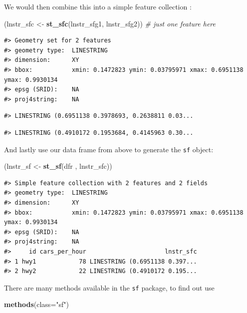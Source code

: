 \documentclass[]{book}
\newenvironment{Shaded}{\begin{snugshade}}{\end{snugshade}}
\newcommand{\KeywordTok}[1]{\textcolor[rgb]{0.13,0.29,0.53}{\textbf{#1}}}
\newcommand{\DataTypeTok}[1]{\textcolor[rgb]{0.13,0.29,0.53}{#1}}
\newcommand{\StringTok}[1]{\textcolor[rgb]{0.31,0.60,0.02}{#1}}
\newcommand{\CommentTok}[1]{\textcolor[rgb]{0.56,0.35,0.01}{\textit{#1}}}
\newcommand{\NormalTok}[1]{#1}
\begin{document}
We would then combine this into a simple feature collection :

\begin{Shaded}
\begin{Highlighting}[]
\NormalTok{(lnstr_sfc <-}\StringTok{ }\KeywordTok{st_sfc}\NormalTok{(lnstr_sfg1, lnstr_sfg2)) }\CommentTok{# just one feature here}
\end{Highlighting}
\end{Shaded}

\begin{verbatim}
#> Geometry set for 2 features 
#> geometry type:  LINESTRING
#> dimension:      XY
#> bbox:           xmin: 0.1472823 ymin: 0.03795971 xmax: 0.6951138 ymax: 0.9930134
#> epsg (SRID):    NA
#> proj4string:    NA
\end{verbatim}

\begin{verbatim}
#> LINESTRING (0.6951138 0.3978693, 0.2638811 0.03...
\end{verbatim}

\begin{verbatim}
#> LINESTRING (0.4910172 0.1953684, 0.4145963 0.30...
\end{verbatim}

And lastly use our data frame from above to generate the \texttt{sf}
object:

\begin{Shaded}
\begin{Highlighting}[]
\NormalTok{(lnstr_sf <-}\StringTok{ }\KeywordTok{st_sf}\NormalTok{(dfr , lnstr_sfc))}
\end{Highlighting}
\end{Shaded}

\begin{verbatim}
#> Simple feature collection with 2 features and 2 fields
#> geometry type:  LINESTRING
#> dimension:      XY
#> bbox:           xmin: 0.1472823 ymin: 0.03795971 xmax: 0.6951138 ymax: 0.9930134
#> epsg (SRID):    NA
#> proj4string:    NA
#>     id cars_per_hour                      lnstr_sfc
#> 1 hwy1            78 LINESTRING (0.6951138 0.397...
#> 2 hwy2            22 LINESTRING (0.4910172 0.195...
\end{verbatim}

There are many methods available in the \texttt{sf} package, to find out
use

\begin{Shaded}
\begin{Highlighting}[]
\KeywordTok{methods}\NormalTok{(}\DataTypeTok{class=}\StringTok{"sf"}\NormalTok{)}
\end{Highlighting}
\end{Shaded}
\end{document}

